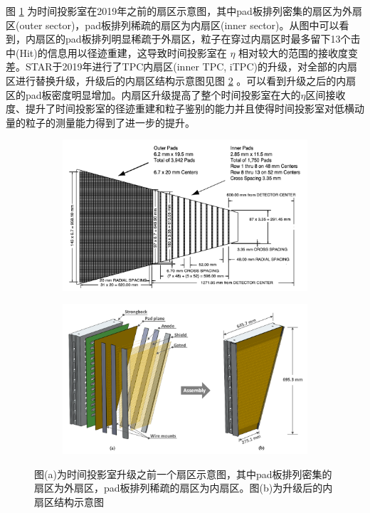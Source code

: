 图 \ref{fig:TPC_sector} 为时间投影室在2019年之前的扇区示意图，其中pad板排列密集的扇区为外扇区(outer sector)，pad板排列稀疏的扇区为内扇区(inner sector)。从图中可以看到，内扇区的pad板排列明显稀疏于外扇区，粒子在穿过内扇区时最多留下13个击中(Hit)的信息用以径迹重建，这导致时间投影室在 $\eta$ 相对较大的范围的接收度变差。STAR于2019年进行了TPC内扇区(inner TPC, iTPC)的升级，对全部的内扇区进行替换升级，升级后的内扇区结构示意图见图 \ref{fig:iTPC} 。可以看到升级之后的内扇区的pad板密度明显增加。内扇区升级提高了整个时间投影室在大的$\eta$区间接收度、提升了时间投影室的径迹重建和粒子鉴别的能力并且使得时间投影室对低横动量的粒子的测量能力得到了进一步的提升。

\begin{figure}[htb]
    \centering
    \begin{subfigure}[b]{0.47\textwidth}
        \centering
        \includegraphics[width=\textwidth,clip]{figures/Chapter2/MWPC.png}
        \caption{}
        \label{fig:TPC_sector}
    \end{subfigure}
    \hfill
    \begin{subfigure}[b]{0.47\textwidth}
        \centering
        \includegraphics[width=\textwidth,clip]{figures/Chapter2/iTPC.png}
        \caption{}
        \label{fig:iTPC}
    \end{subfigure}
       \caption[TPC扇区示意图与iTPC升级后结构示意图]{图(a)为时间投影室升级之前一个扇区示意图，其中pad板排列密集的扇区为外扇区，pad板排列稀疏的扇区为内扇区。图(b)为升级后的内扇区结构示意图}
       \label{fig:MWPC}
\end{figure}

